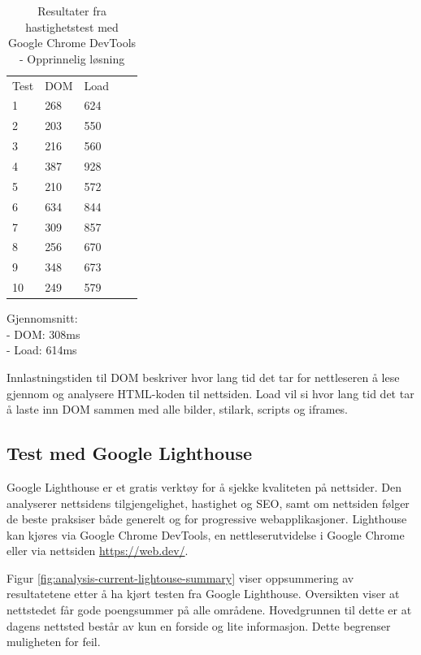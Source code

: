 \begin{table}[H]
\begin{center}
\begin{tabular}{lllll}
Test & DOM & Load &  &  \\
1 & 268 & 624 &  &  \\
2 & 203 & 550 &  &  \\
3 & 216 & 560 &  &  \\
4 & 387 & 928 &  &  \\
5 & 210 & 572 &  &  \\
6 & 634 & 844 &  &  \\
7 & 309 & 857 &  &  \\
8 & 256 & 670 &  &  \\
9 & 348 & 673 &  &  \\
10 & 249 & 579 &  &  \\
\end{tabular}
\end{center}
\caption{\label{tab:table-analysis-current-website}Resultater fra hastighetstest med Google Chrome DevTools - Opprinnelig løsning}
\end{table}

Gjennomsnitt:\\
- DOM: 308ms\\
- Load: 614ms

Innlastningstiden til DOM beskriver hvor lang tid det tar for nettleseren å lese gjennom og analysere HTML-koden til nettsiden. Load vil si hvor lang tid det tar å laste inn DOM sammen med alle bilder, stilark, scripts og iframes.

\subsection{Test med Google Lighthouse}
\label{sec:analysis-current-lighthouse}
\label{sec:google-lighthouse}
Google Lighthouse \cite{google2018lig} er et gratis verktøy for å sjekke kvaliteten på nettsider. Den analyserer nettsidens tilgjengelighet, hastighet og SEO, samt om nettsiden følger de beste praksiser både generelt og for progressive webapplikasjoner. Lighthouse kan kjøres via Google Chrome DevTools, en nettleserutvidelse i Google Chrome eller via nettsiden \url{https://web.dev/}.

Figur \ref{fig:analysis-current-lightouse-summary} viser oppsummering av resultatetene etter å ha kjørt testen fra Google Lighthouse. Oversikten viser at nettstedet får gode poengsummer på alle områdene. Hovedgrunnen til dette er at dagens nettsted består av kun en forside og lite informasjon. Dette begrenser muligheten for feil.

